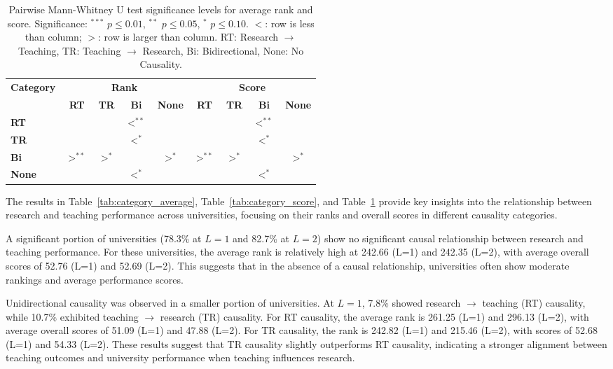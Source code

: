 \documentclass[a4paper, conference]{IEEEtran}
\begin{document}
\begin{table}
	\centering
	\caption{Pairwise Mann-Whitney U test significance levels for average rank and score. Significance: $^{***}$ $p \leq 0.01$, $^{**}$ $p \leq 0.05$, $^{*}$ $p \leq 0.10$. $<$: row is less than column; $>$: row is larger than column. RT: Research $\rightarrow$ Teaching, TR: Teaching $\rightarrow$ Research, Bi: Bidirectional, None: No Causality.}
	\label{tab:significance}
	\begin{scriptsize}
		\begin{tabular}{|l|cccc|cccc|}
			\hline
			\multirow{2}{*}{\textbf{Category}} 
			& \multicolumn{4}{c|}{\textbf{Rank}} 
			& \multicolumn{4}{c|}{\textbf{Score}} \\ \cline{2-9}
			& \textbf{RT} & \textbf{TR} & \textbf{Bi} & \textbf{None} 
			& \textbf{RT} & \textbf{TR} & \textbf{Bi} & \textbf{None} \\ \hline
			\textbf{RT}   &     &      & $<^{**}$ &      &     &      & $<^{**}$ &      \\ \hline
			\textbf{TR}   &     &      & $<^{*}$  &      &     &      & $<^{*}$  &      \\ \hline
			\textbf{Bi}   & $>^{**}$ & $>^{*}$   &     & $>^{*}$   & $>^{**}$ & $>^{*}$   &     & $>^{*}$   \\ \hline
			\textbf{None} &     &      & $<^{*}$  &     &     &      & $<^{*}$  &     \\ \hline
		\end{tabular}
	\end{scriptsize}
\end{table}

The results in Table~\ref{tab:category_average}, Table~\ref{tab:category_score}, and Table~\ref{tab:significance} provide key insights into the relationship between research and teaching performance across universities, focusing on their ranks and overall scores in different causality categories.

A significant portion of universities (78.3\% at $L=1$ and 82.7\% at $L=2$) show no significant causal relationship between research and teaching performance. For these universities, the average rank is relatively high at 242.66 (L=1) and 242.35 (L=2), with average overall scores of 52.76 (L=1) and 52.69 (L=2). This suggests that in the absence of a causal relationship, universities often show moderate rankings and average performance scores.

Unidirectional causality was observed in a smaller portion of universities. At $L=1$, 7.8\% showed research $\rightarrow$ teaching (RT) causality, while 10.7\% exhibited teaching $\rightarrow$ research (TR) causality. For RT causality, the average rank is 261.25 (L=1) and 296.13 (L=2), with average overall scores of 51.09 (L=1) and 47.88 (L=2). For TR causality, the rank is 242.82 (L=1) and 215.46 (L=2), with scores of 52.68 (L=1) and 54.33 (L=2). These results suggest that TR causality slightly outperforms RT causality, indicating a stronger alignment between teaching outcomes and university performance when teaching influences research.
\end{document}

